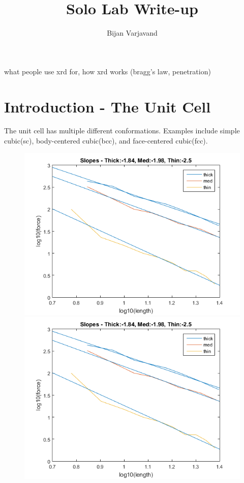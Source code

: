 \documentclass{article}
\author{Bijan Varjavand}
\title{Solo Lab Write-up}
\begin{document}
\maketitle

what people use xrd for, how xrd works (bragg's law, penetration)

\section{Introduction - The Unit Cell}

The unit cell has multiple different conformations. Examples include simple cubic(sc), body-centered cubic(bcc), and face-centered cubic(fcc).

\begin{figure}[h]
	\begin{minipage}{0.32\textwidth}
		\centering
		\includegraphics[scale=.3]{Lab1f1.png}
	\end{minipage}
	\begin{minipage}{0.32\textwidth}
		\centering
		\includegraphics[scale=.3]{Lab1f1.png}

\end{minipage}
\end{figure}
\end{document}
